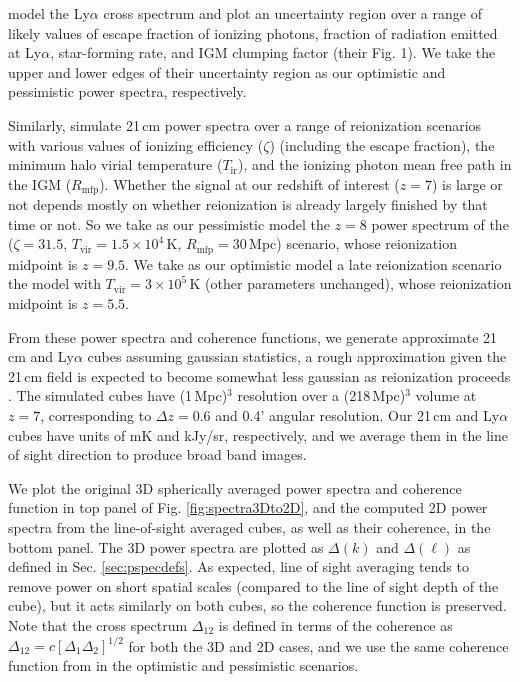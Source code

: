 \documentclass{emulateapj}
\begin{document}
\citet{Gong2014} model the Ly$\alpha$ cross spectrum and plot an uncertainty region over a range of likely values of escape fraction of ionizing photons, fraction of radiation emitted at Ly$\alpha$, star-forming rate, and IGM clumping factor (their Fig. 1). We take the upper and lower edges of their uncertainty region as our optimistic and pessimistic power spectra, respectively. 

Similarly, \citet{PoberNextGen} simulate 21\,cm power spectra over a range of reionization scenarios with various values of ionizing efficiency ($\zeta$) (including the escape fraction), the minimum halo virial temperature ($T_\text{ir}$), and the ionizing photon mean free path in the IGM ($R_\text{mfp}$). Whether the signal at our redshift of interest ($z=7$) is large or not depends mostly on whether reionization is already largely finished by that time or not. So we take as our pessimistic model the $z=8$ power spectrum of the ($\zeta =31.5$, $T_\text{vir}=1.5\times10^4$\,K, $R_\text{mfp}=30$\,Mpc) scenario, whose reionization midpoint is $z=9.5$. We take as our optimistic model a late reionization scenario the model with $T_\text{vir}=3\times10^5$\,K (other parameters unchanged), whose reionization midpoint is $z=5.5$. 

From these power spectra and coherence functions, we generate approximate 21\,cm and Ly$\alpha$ cubes assuming gaussian statistics, a rough approximation given the 21\,cm field is expected to become somewhat less  gaussian as reionization proceeds \citep{skew}. The simulated cubes have (1\,Mpc)$^3$ resolution over a (218\,Mpc)$^3$ volume at $z=7$, corresponding to $\Delta z=0.6$ and 0.4' angular resolution. Our 21\,cm and Ly$\alpha$ cubes have units of mK and kJy/sr, respectively, and we average them in the line of sight direction to produce broad band images.

We plot the original 3D spherically averaged power spectra and coherence function in top panel of Fig. \ref{fig:spectra3Dto2D}, and the computed 2D power spectra from the line-of-sight averaged cubes, as well as their coherence, in the bottom panel. The 3D power spectra are plotted as $\Delta(k)$ and $\Delta(\ell)$ as defined in Sec. \ref{sec:pspecdefs}. As expected, line of sight averaging tends to remove power on short spatial scales (compared to the line of sight depth of the cube), but it acts similarly on both cubes, so the coherence function is preserved. Note that the cross spectrum $\Delta_{12}$ is defined in terms of the coherence as $\Delta_{12}=c[\Delta_1\Delta_2]^{1/2}$ for both the 3D and 2D cases, and we use the same coherence function from \citet{Heneka2016} in the optimistic and pessimistic scenarios.
\end{document}
